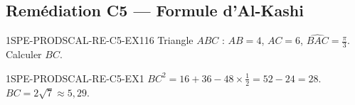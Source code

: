 
\subsection*{Remédiation C5 — Formule d'Al-Kashi}

\begin{exercice}{1SPE-PRODSCAL-RE-C5-EX1}{1}{6}
Triangle $ABC$ : $AB=4$, $AC=6$, $\widehat{BAC}=\frac{\pi}{3}$. Calculer $BC$.
\end{exercice}


\begin{corrige}{1SPE-PRODSCAL-RE-C5-EX1}
$BC^2 = 16+36-48\times\frac{1}{2} = 52-24 = 28$. $BC = 2\sqrt{7} \approx 5{,}29$.
\end{corrige}

